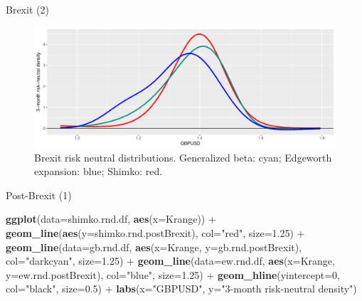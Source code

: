\documentclass[ignorenonframetext,aspectratio=169]{beamer}
\newenvironment{Shaded}{}{}
\newcommand{\KeywordTok}[1]{\textcolor[rgb]{0.00,0.44,0.13}{\textbf{#1}}}
\newcommand{\DataTypeTok}[1]{\textcolor[rgb]{0.56,0.13,0.00}{#1}}
\newcommand{\DecValTok}[1]{\textcolor[rgb]{0.25,0.63,0.44}{#1}}
\newcommand{\FloatTok}[1]{\textcolor[rgb]{0.25,0.63,0.44}{#1}}
\newcommand{\StringTok}[1]{\textcolor[rgb]{0.25,0.44,0.63}{#1}}
\newcommand{\OperatorTok}[1]{\textcolor[rgb]{0.40,0.40,0.40}{#1}}
\newcommand{\NormalTok}[1]{#1}
\begin{document}
\begin{frame}{Brexit (2)}

\begin{figure}
\includegraphics[width=1\linewidth]{2018_02_07_IMF_FXCourse_files/figure-beamer/unnamed-chunk-80-1} \caption{Brexit risk neutral distributions. Generalized beta: cyan; Edgeworth expansion: blue; Shimko: red.}\label{fig:unnamed-chunk-80}
\end{figure}

\end{frame}

\begin{frame}[fragile]{Post-Brexit (1)}

\begin{Shaded}
\begin{Highlighting}[]
\KeywordTok{ggplot}\NormalTok{(}\DataTypeTok{data=}\NormalTok{shimko.rnd.df, }\KeywordTok{aes}\NormalTok{(}\DataTypeTok{x=}\NormalTok{Krange)) }\OperatorTok{+}\StringTok{ }
\StringTok{  }\KeywordTok{geom_line}\NormalTok{(}\KeywordTok{aes}\NormalTok{(}\DataTypeTok{y=}\NormalTok{shimko.rnd.postBrexit), }\DataTypeTok{col=}\StringTok{"red"}\NormalTok{, }\DataTypeTok{size=}\FloatTok{1.25}\NormalTok{) }\OperatorTok{+}
\StringTok{  }\KeywordTok{geom_line}\NormalTok{(}\DataTypeTok{data=}\NormalTok{gb.rnd.df, }\KeywordTok{aes}\NormalTok{(}\DataTypeTok{x=}\NormalTok{Krange, }\DataTypeTok{y=}\NormalTok{gb.rnd.postBrexit), }
            \DataTypeTok{col=}\StringTok{"darkcyan"}\NormalTok{, }\DataTypeTok{size=}\FloatTok{1.25}\NormalTok{) }\OperatorTok{+}
\StringTok{  }\KeywordTok{geom_line}\NormalTok{(}\DataTypeTok{data=}\NormalTok{ew.rnd.df, }\KeywordTok{aes}\NormalTok{(}\DataTypeTok{x=}\NormalTok{Krange, }\DataTypeTok{y=}\NormalTok{ew.rnd.postBrexit), }
            \DataTypeTok{col=}\StringTok{"blue"}\NormalTok{, }\DataTypeTok{size=}\FloatTok{1.25}\NormalTok{) }\OperatorTok{+}
\StringTok{  }\KeywordTok{geom_hline}\NormalTok{(}\DataTypeTok{yintercept=}\DecValTok{0}\NormalTok{, }\DataTypeTok{col=}\StringTok{"black"}\NormalTok{, }\DataTypeTok{size=}\FloatTok{0.5}\NormalTok{) }\OperatorTok{+}
\StringTok{  }\KeywordTok{labs}\NormalTok{(}\DataTypeTok{x=}\StringTok{"GBPUSD"}\NormalTok{, }\DataTypeTok{y=}\StringTok{"3-month risk-neutral density"}\NormalTok{)   }
\end{Highlighting}
\end{Shaded}

\end{frame}
\end{document}
